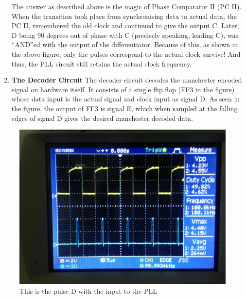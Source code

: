 \documentclass{article}
\begin{document}
\begin{enumerate}[label=(\Alph*)]
The answer as described above is the magic of Phase Comparator II (PC II). When the transition took place from synchronising data to actual data, the PC II, remembered the old clock and continued to give the output C. Later, D being 90 degrees out of phase with C (precisely speaking, leading C), was “AND”ed with the output of the differentiator. Because of this, as shown in the above figure, only the pulses correspond to the actual clock survive! And thus, the PLL circuit still retains the actual clock frequency.    



\item \textbf{The Decoder Circuit}
  The decoder circuit decodes the manchester encoded signal on hardware itself. It consists of a single flip flop (FF3 in the figure) whose data input is the actual signal and clock input as signal D. As seen in the figure, the output of FF3 is signal E, which when sampled at the falling edges of signal D gives the desired manchester decoded data. 
  
\end{enumerate}

\begin{figure}[h]
	\centering
	\includegraphics[scale = 0.1]{images/Diff_one_pulse.JPG}
	\caption{This is the pulse D with the input to the PLL}
	\label{Fig :1b}
\end{figure}
\end{document}
